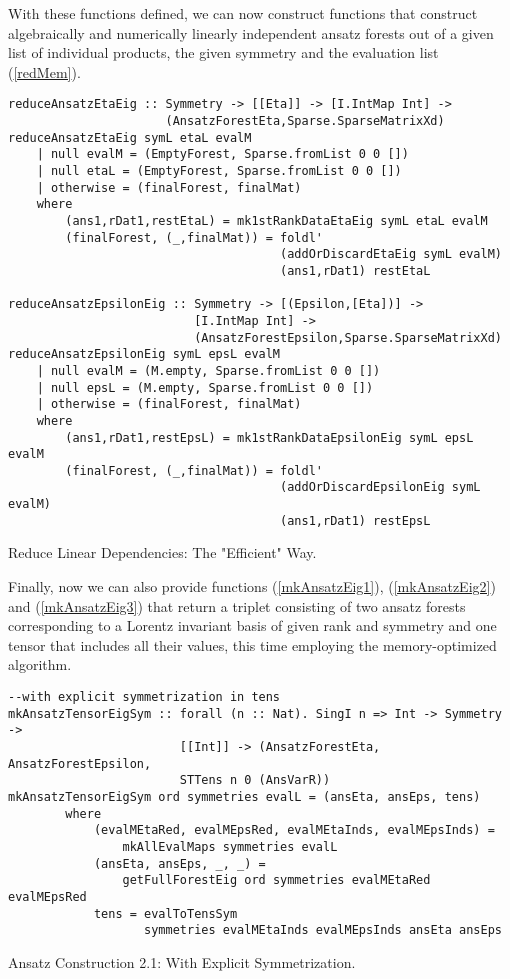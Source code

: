 With these functions defined, we can now construct functions that construct algebraically and numerically linearly independent ansatz forests out of a given list of individual products, the given symmetry and the evaluation list (\ref{redMem}).
\begin{listing}[hbt!]
\begin{verbatim}
reduceAnsatzEtaEig :: Symmetry -> [[Eta]] -> [I.IntMap Int] ->
                      (AnsatzForestEta,Sparse.SparseMatrixXd)
reduceAnsatzEtaEig symL etaL evalM
    | null evalM = (EmptyForest, Sparse.fromList 0 0 [])
    | null etaL = (EmptyForest, Sparse.fromList 0 0 [])
    | otherwise = (finalForest, finalMat)
    where
        (ans1,rDat1,restEtaL) = mk1stRankDataEtaEig symL etaL evalM
        (finalForest, (_,finalMat)) = foldl' 
                                      (addOrDiscardEtaEig symL evalM)
                                      (ans1,rDat1) restEtaL

reduceAnsatzEpsilonEig :: Symmetry -> [(Epsilon,[Eta])] ->
                          [I.IntMap Int] ->
                          (AnsatzForestEpsilon,Sparse.SparseMatrixXd)
reduceAnsatzEpsilonEig symL epsL evalM
    | null evalM = (M.empty, Sparse.fromList 0 0 [])
    | null epsL = (M.empty, Sparse.fromList 0 0 [])
    | otherwise = (finalForest, finalMat)
    where
        (ans1,rDat1,restEpsL) = mk1stRankDataEpsilonEig symL epsL evalM
        (finalForest, (_,finalMat)) = foldl'
                                      (addOrDiscardEpsilonEig symL evalM)
                                      (ans1,rDat1) restEpsL
\end{verbatim} 
\caption{Reduce Linear Dependencies: The "Efficient" Way.}\label{redMem}
\end{listing}
Finally, now we can also provide functions (\ref{mkAnsatzEig1}), (\ref{mkAnsatzEig2}) and (\ref{mkAnsatzEig3}) that return a triplet consisting of two ansatz forests corresponding to a Lorentz invariant basis of given rank and symmetry and one tensor that includes all their values, this time employing the memory-optimized algorithm. 
\begin{listing}[hbt!]
\begin{verbatim}
--with explicit symmetrization in tens
mkAnsatzTensorEigSym :: forall (n :: Nat). SingI n => Int -> Symmetry ->
                        [[Int]] -> (AnsatzForestEta, AnsatzForestEpsilon,
                        STTens n 0 (AnsVarR))
mkAnsatzTensorEigSym ord symmetries evalL = (ansEta, ansEps, tens)
        where
            (evalMEtaRed, evalMEpsRed, evalMEtaInds, evalMEpsInds) =
                mkAllEvalMaps symmetries evalL 
            (ansEta, ansEps, _, _) =
                getFullForestEig ord symmetries evalMEtaRed evalMEpsRed
            tens = evalToTensSym
                   symmetries evalMEtaInds evalMEpsInds ansEta ansEps
\end{verbatim} 
\caption{Ansatz Construction 2.1: With Explicit Symmetrization.}\label{mkAnsatzEig1}
\end{listing}
